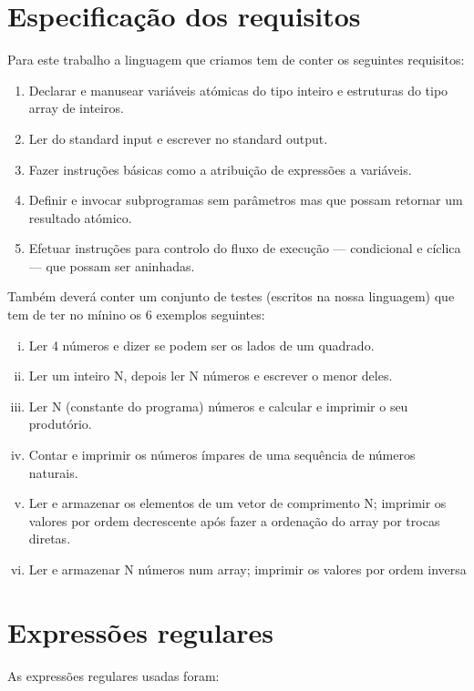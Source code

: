 \documentclass{report}
\begin{document}
\section{Especificação dos requisitos}
\indent
Para este trabalho a linguagem que criamos tem de conter os seguintes requisitos:
\begin{enumerate}
	\item Declarar e manusear variáveis atómicas do tipo inteiro e estruturas do tipo array de inteiros.
	\item Ler do standard input e escrever no standard output.
	\item Fazer instruções básicas como a atribuição de expressões a variáveis.
	\item Definir e invocar subprogramas sem parâmetros mas que possam retornar um resultado atómico.
	\item Efetuar instruções para controlo do fluxo de execução — condicional e cíclica — que possam ser aninhadas.
\end{enumerate}
\indent
Também deverá conter um conjunto de testes (escritos na nossa linguagem) que tem de ter no mínino os 6 exemplos seguintes:
\begin{enumerate}[i)]
	\item Ler 4 números e dizer se podem ser os lados de um quadrado.
	\item Ler um inteiro N, depois ler N números e escrever o menor deles.
	\item Ler N (constante do programa) números e calcular e imprimir o seu produtório.
	\item Contar e imprimir os números ímpares de uma sequência de números naturais.
	\item Ler e armazenar os elementos de um vetor de comprimento N; imprimir os valores por ordem decrescente após
	fazer a ordenação do array por trocas diretas.
	\item Ler e armazenar N números num array; imprimir os valores por ordem inversa
\end{enumerate} 
\section{Expressões regulares} 
As expressões regulares usadas foram:
\end{document}
